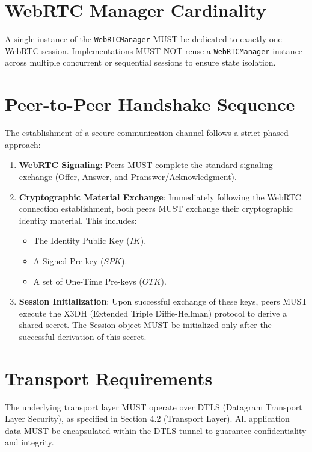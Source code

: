

\section{WebRTC Manager Cardinality}

A single instance of the \texttt{WebRTCManager} MUST be dedicated to exactly
one WebRTC session. Implementations MUST NOT reuse a \texttt{WebRTCManager}
instance across multiple concurrent or sequential sessions to ensure state
isolation.

\section{Peer-to-Peer Handshake Sequence}

The establishment of a secure communication channel follows a strict phased
approach:

\begin{enumerate}
    \item \textbf{WebRTC Signaling}: Peers MUST complete the standard signaling
        exchange (Offer, Answer, and Pranswer/Acknowledgment).

    \item \textbf{Cryptographic Material Exchange}: Immediately following the
        WebRTC connection establishment, both peers MUST exchange their
        cryptographic identity material. This includes:
        \begin{itemize}
            \item The Identity Public Key (\(IK\)).
            \item A Signed Pre-key (\(SPK\)).
            \item A set of One-Time Pre-keys (\(OTK\)).
        \end{itemize}

        \item \textbf{Session Initialization}: Upon successful exchange of
        these keys, peers MUST execute the X3DH (Extended Triple
        Diffie-Hellman) protocol to derive a shared secret. The Session object
        MUST be initialized only after the successful derivation of this
        secret.
\end{enumerate}

\section{Transport Requirements}

The underlying transport layer MUST operate over DTLS (Datagram Transport Layer
Security), as specified in Section 4.2 (Transport Layer). All application data
MUST be encapsulated within the DTLS tunnel to guarantee confidentiality and
integrity.